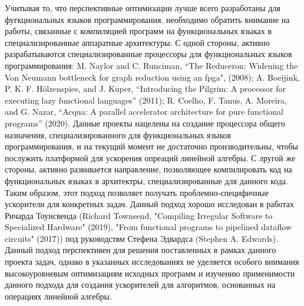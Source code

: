 \documentclass[12pt]{article}  %
\theoremstyle{remark}
\begin{document}
Учитывая то, что перспективные оптимизации лучше всего разработаны для фугкциональных языков программирования, необходимо обратить внимание на работы, связанные с компиляцией программ на функциональных языках в специализированные аппаратные архитектуры. С одной стороны, активно разрабатываются специализированные процессоры для функциональных языков программирования: M. Naylor and C. Runciman, “The Reduceron: Widening the Von Neumann bottleneck for graph reduction using an fpga", (2008); A. Boeijink, P. K. F. Hölzenspies, and J. Kuper, “Introducing the Pilgrim: A processor for executing lazy functional languages” (2011); R. Coelho, F. Tanus, A. Moreira, and G. Nazar, “Acqua: A parallel accelerator architecture for pure functional programs” (2020). Данные проекты нацелены на создание процессора общего назначения, специализированного для функциональных языков программирования, и на текущий момент не достаточно производительны, чтобы послужить платформой для ускорения опреаций линейной алгебры. С лругой же стороны, активно развивается направление, позволяющее компилировать код на функциональных языках в архитектры, специализированные для данного кода. Таким образом, этот подход позволяет получать проблемно-специфичные ускорители для конкретных задач. Данный подход хорошо исследован в работах Ричарда Тоунсвенда (Richard Townsend, "Compiling Irregular Software to Specialized Hardware" (2019), "From functional programs to pipelined dataflow circuits" (2017)) под руководствм Стефена Эдвардса (Stephen A. Edwards). Данный подход перспективен для решения поставленных в рамках данного проекта задач, однако в указанных исследованиях не уделяется особого внимания высокоуровневым оптимизациям исходных программ и изучению применимости данного подхода для создания ускорителей для алгоритмов, основанных на операциях линейной алгебры.
\end{document}
